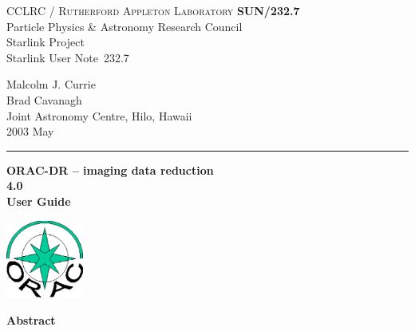 \documentclass[twoside,11pt]{article}
\newcommand{\stardoccategory}  {Starlink User Note}
\newcommand{\stardocinitials}  {SUN}
\newcommand{\stardocnumber}    {232.7}
\newcommand{\stardocauthors}   {Malcolm J. Currie\\
                               Brad Cavanagh\\
                               Joint Astronomy Centre, Hilo, Hawaii}
\newcommand{\stardocdate}      {2003 May}
\newcommand{\stardoctitle}     {ORAC-DR -- imaging data reduction}
\newcommand{\stardocversion}   {4.0}
\newcommand{\stardocmanual}    {User Guide}
\newcommand{\stardocname}{\stardocinitials /\stardocnumber}
\newenvironment{latexonly}{}{}
\renewcommand{\_}{\texttt{\symbol{95}}}
\begin{document}
\thispagestyle{empty}

\begin{latexonly}
   CCLRC / \textsc{Rutherford Appleton Laboratory} \hfill \textbf{\stardocname}\\
   {\large Particle Physics \& Astronomy Research Council}\\
   {\large Starlink Project\\}
   {\large \stardoccategory\ \stardocnumber}
   \begin{flushright}
   \stardocauthors\\
   \stardocdate
   \end{flushright}
   \vspace{-4mm}
   \rule{\textwidth}{0.5mm}
   \vspace{5mm}
   \begin{center}
   {\Huge\textbf{\stardoctitle \\ [2.5ex]}}
   {\LARGE\textbf{\stardocversion \\ [4ex]}}
   {\Huge\textbf{\stardocmanual}}
   \end{center}
   \vspace{5mm}

\begin{center}
\includegraphics[width=1.0in]{sun232_logo.eps}
\end{center}

   \vspace{10mm}
   \begin{center}
      {\Large\textbf{Abstract}}
   \end{center}
\end{latexonly}
\end{document}
